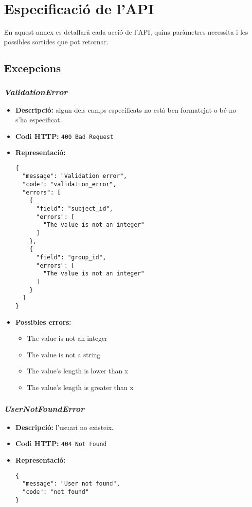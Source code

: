 \chapter{Especificació de l'API}\label{manual}
En aquest annex es detallarà cada acció de l'\ac{API}, quins paràmetres necessita i les possibles sortides que pot retornar.

\section{Excepcions}

\subsection{\emph{ValidationError}}
\begin{itemize}
	\item \textbf{Descripció:} algun dels camps especificats no està ben formatejat o bé no s'ha especificat.
	\item \textbf{Codi \ac{HTTP}:} \texttt{400 Bad Request}
	\item \textbf{Representació:}
\begin{verbatim}
{
  "message": "Validation error",
  "code": "validation_error",
  "errors": [
    {
      "field": "subject_id",
      "errors": [
        "The value is not an integer"
      ]
    },
    {
      "field": "group_id",
      "errors": [
        "The value is not an integer"
      ]
    }
  ]
}
\end{verbatim}

\item \textbf{Possibles errors:}
	\begin{itemize}
		\item The value is not an integer
		\item The value is not a string
		\item The value's length is lower than x
		\item The value's length is greater than x
	\end{itemize}
\end{itemize}
\subsection{\emph{UserNotFoundError}}
\begin{itemize}
	\item \textbf{Descripció:} l'usuari no existeix.

	\item \textbf{Codi \ac{HTTP}:} \texttt{404 Not Found}
	\item \textbf{Representació:}
\begin{verbatim}
{
  "message": "User not found",
  "code": "not_found"
}
\end{verbatim}
\end{itemize}
